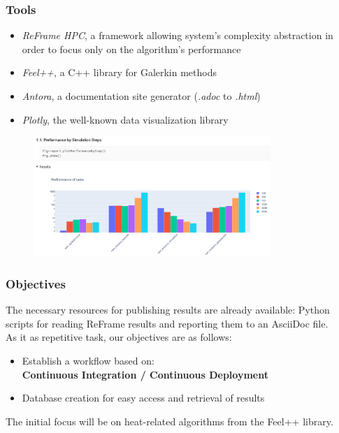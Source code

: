 \documentclass[10pt]{beamer}
\begin{document}
\begin{frame}
    \frametitle{\textbf{Tools}}
    \begin{itemize}
        \addtolength{\itemsep}{10pt}
        \item \textit{ReFrame HPC}, a framework allowing system's complexity abstraction in order to focus only on the algorithm's performance
        \item \textit{Feel++}, a C++ library for Galerkin methods
        \item \textit{Antora}, a documentation site generator \small(\textit{.adoc} to \textit{.html})
        \item \textit{Plotly}, the well-known data visualization library
    \end{itemize}
    \begin{figure}
        \centering
        \includegraphics[width=0.8\textwidth]{../../illustrations/benchmarking-graphics.png}
      \end{figure}
\end{frame}


\begin{frame}
    \frametitle{\textbf{Objectives}}
    The necessary resources for publishing results are already available:
    Python scripts for reading ReFrame results and reporting them to an AsciiDoc file.\\
    As it as repetitive task, our objectives are as follows:\\
    [10pt]
    \begin{itemize}
        \addtolength{\itemsep}{10pt}
        \item Establish a workflow based on:\\
                [0.2cm]
                \textbf{Continuous Integration / Continuous Deployment}
        \item Database creation for easy access and retrieval of results\\
        [1cm]
    \end{itemize}
    The initial focus will be on heat-related algorithms from the Feel++ library.\\
\end{frame}
\end{document}

